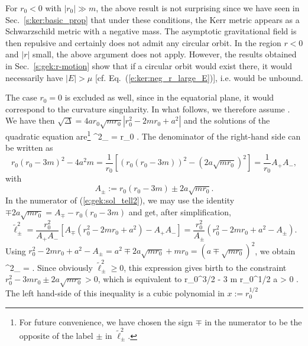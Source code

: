 \begin{remark}
For $r_0 < 0$ with $|r_0|\gg m$, the above result is not surprising since we
have seen in Sec.~\ref{s:ker:basic_prop} that under these conditions,
the Kerr metric appears as a Schwarzschild metric with a negative mass. The
asymptotic gravitational field is then repulsive and certainly does not admit
any circular orbit. In the region $r < 0$ and $|r|$ small, the above argument does not apply.
However, the results obtained in Sec.~\ref{s:gek:r-motion}
show that if a circular orbit would exist there, it would necessarily
have $|E| > \mu$ [cf. Eq.~(\ref{e:ker:neg_r_large_E})], i.e. would be unbound.
\end{remark}
The case $r_0=0$ is excluded as well, since in the equatorial plane, it would
correspond to the curvature singularity. In what follows, we therefore assume
\be \label{e:gek:circ_r0_positive}
    .
\ee
We have then $\sqrt{\mathit{\Delta}} = 4 a r_0 \sqrt{m r_0} |r_0^2 - 2m r_0 + a^2|$
and the solutions of the quadratic equation are\footnote{For future convenience, we have
chosen the sign $\mp$ in the numerator to be the opposite of the label $\pm$
in $\tilde{\ell}^2_{\pm}$.}
\be \label{e:gek:sol_tell2}
    \tilde{\ell}^2_{\pm} = r_0  .
\ee
The denominator of the right-hand side can be written as
\[
    r_0 (r_0 - 3m)^2  - 4 a^2 m = \frac{1}{r_0} \left[
        \left( r_0 (r_0 - 3m) \right) ^2 - \left( 2 a \sqrt{m r_0} \right) ^2 \right]
        = \frac{1}{r_0} A_+ A_- ,
\]
with
\[
    A_\pm := r_0 (r_0 - 3m) \pm 2 a \sqrt{m r_0} .
\]
In the numerator of (\ref{e:gek:sol_tell2}), we may use the identity
$\mp 2 a \sqrt{m r_0} = A_\mp - r_0 (r_0 - 3m)$ and get, after
simplification,
\[
    \tilde{\ell}^2_{\pm} = \frac{r_0^2}{A_+ A_-} \left[ A_\mp (r_0^2 - 2m r_0 + a^2)
     - A_+ A_- \right] = \frac{r_0^2}{A_\pm} \left(
        r_0^2 - 2m r_0 + a^2 - A_\pm \right) .
\]
Using $r_0^2 - 2m r_0 + a^2 - A_\pm  =  a^2 \mp 2a \sqrt{m r_0} + m r_0 =
(a \mp \sqrt{m r_0})^2$, we obtain
\be \label{e:gek:tell2_circ}
    \tilde{\ell}^2_{\pm} =  .
\ee
Since obviously $\tilde{\ell}^2_{\pm} \geq 0$, this expression gives birth to
the constraint $r_0^2 - 3m r_0 \pm 2 a \sqrt{m r_0} > 0$,
which is equivalent to
\be \label{e:gek:cubic_sqrt_r0}
    r_0^{3/2} - 3 m r_0^{1/2}   a  > 0 .
\ee
The left hand-side of this inequality is a cubic polynomial in $x:=r_0^{1/2}$
